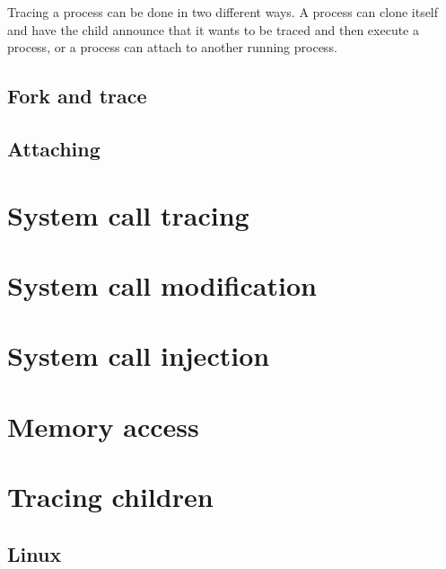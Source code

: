 \documentclass[a4paper, twoside, 10pt, twocolumn]{report}
\begin{document}
Tracing a process can be done in two different ways. A process can clone itself
and have the child announce that it wants to be traced and then execute a
process, or a process can attach to another running process.

\subsection{Fork and trace}

\subsection{Attaching}


\section{System call tracing}

\section{System call modification}

\section{System call injection}


\section{Memory access}


\section{Tracing children}

\subsection{Linux}
\end{document}
